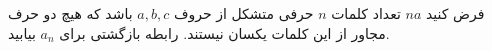 \exercise
فرض کنید 
$na$
تعداد کلمات 
$n$
 حرفی متشکل از حروف 
$a, b, c$
 باشد که هیچ دو حرف مجاور از این کلمات یکسان نیستند. رابطه بازگشتی برای
$a_n$
بیابید.